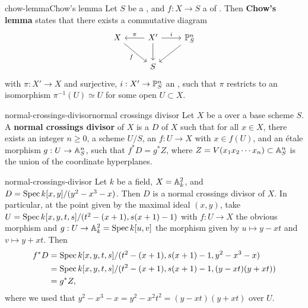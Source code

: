 \begin{topic}{chow-lemma}{Chow's lemma}
    Let $S$ be a  , and $f : X \to S$ a  of . Then \textbf{Chow's lemma} states that there exists a commutative diagram
    \[ \begin{tikzcd}
        X \arrow[swap]{dr}{f} & X' \arrow[swap]{l}{\pi} \arrow{r}{i} \arrow{d} & \PP^n_S \arrow{dl} \\ & S &
    \end{tikzcd} \]
    with $\pi : X' \to X$  and surjective, $i : X' \to \PP^n_S$ an , such that $\pi$ restricts to an isomorphism $\pi^{-1}(U) \simeq U$ for some  open $U \subset X$.
 \end{topic}

\begin{topic}{normal-crossings-divisor}{normal crossings divisor}
    Let $X$ be a  over a base scheme $S$. A \textbf{normal crossings divisor} of $X$ is a  $D$ of $X$ such that for all $x \in X$, there exists an integer $n \ge 0$, a scheme $U/S$, an  $f : U \to X$ with $x \in f(U)$, and an étale morphism $g : U \to \AA^n_S$, such that $f^* D = g^* Z$, where $Z = V(x_1 x_2 \cdots x_n) \subset \AA^n_S$ is the union of the coordinate hyperplanes.
\end{topic}

\begin{example}{normal-crossings-divisor}
    Let $k$ be a field, $X = \AA^2_k$, and $D = \Spec k[x, y] / (y^2 - x^3 - x)$. Then $D$ is a normal crossings divisor of $X$. In particular, at the point given by the maximal ideal $(x, y)$, take $U = \Spec k[x, y, t, s] / (t^2 - (x + 1), s (x + 1) - 1)$ with $f : U \to X$ the obvious morphism and $g : U \to \AA^2_k = \Spec k[u, v]$ the morphism given by $u \mapsto y - xt$ and $v \mapsto y + xt$. Then
    \[ \begin{aligned}
        f^* D
            &= \Spec k[x, y, t, s] / (t^2 - (x + 1), s(x + 1) - 1, y^2 - x^3 - x) \\
            &= \Spec k[x, y, t, s] / (t^2 - (x + 1), s(x + 1) - 1, (y - xt)(y + xt)) \\
            &= g^* Z ,
    \end{aligned} \]
    where we used that $y^2 - x^3 - x = y^2 - x^2 t^2 = (y - xt)(y + xt)$ over $U$.
\end{example}

